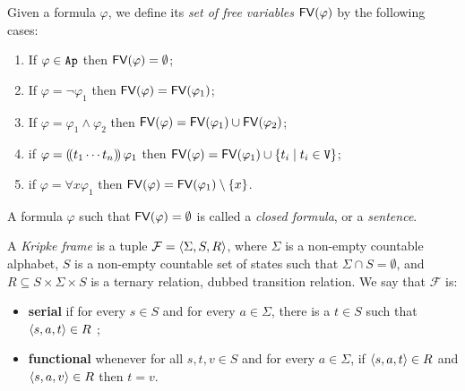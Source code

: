 \documentclass[sigconf,anonymous]{aamas}
\begin{document}
\begin{definition}
      Given a formula $\varphi$, we define its \emph{set of free variables} $\mathsf{FV}(\varphi)$ by the following cases: 

    \begin{enumerate}
        
        \item If $\varphi\in \texttt{Ap}$ then $\mathsf{FV}(\varphi)=\emptyset$; 
        \item If $\varphi=\neg \varphi_1$ then $\mathsf{FV}(\varphi)=\mathsf{FV}(\varphi_1)$; 
        \item If $\varphi=\varphi_1 \land \varphi_2$ then $\mathsf{FV}(\varphi)=\mathsf{FV}(\varphi_1)\cup \mathsf{FV}(\varphi_2)$; 
        \item if $\varphi=(\!( t_1\cdots t_n  )\!)\,\varphi_1$ then 
       $\mathsf{FV}(\varphi)=\mathsf{FV}(\varphi_1)\cup \{t_i \mid t_i\in \texttt{V}\} $;
        
     \item if $\varphi= \forall x \varphi_1$ then $\mathsf{FV}(\varphi)=\mathsf{FV}(\varphi_1)\setminus \{x\}$.
       
        
    \end{enumerate}

    \noindent A formula $\varphi$ such that $\mathsf{FV}(\varphi)=\emptyset$ is called a \emph{closed formula}, or a \emph{sentence}. 
\end{definition}


\begin{definition}
    A \emph{Kripke frame} is a tuple $\mathcal{F}=\langle \Sigma,S,R \rangle$, where $\Sigma$ is a non-empty countable alphabet, $S$ is a non-empty countable set of states  %
    such that $\Sigma \cap S = \emptyset$,
    and  $R\subseteq S\times \Sigma \times S$ is a ternary relation, dubbed transition relation. We say that $\mathcal{F}$ is: 
    \begin{itemize}
        \item[] \textbf{serial} %
        if for every $s\in S$ and for every $a\in \Sigma$, there is a  $t\in S$ such that $\langle s,a,t \rangle\in R$ ; 
        \item[]\textbf{functional} %
        whenever for all $s,t,v\in S$ and for every $a\in \Sigma$, if $\langle s,a,t \rangle\in R$ and $\langle s,a,v \rangle\in R$ then $t=v$. 
      \end{itemize}
\end{definition}
\end{document}
